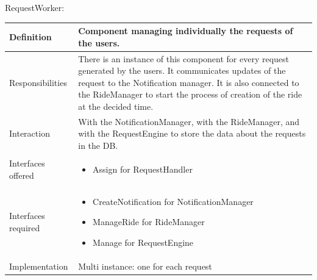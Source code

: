 \documentclass[a4paper,11pt]{report} %
\begin{document}
	\vspace*{0.35cm}
	\centerline{RequestWorker:}
	\begin{center}
		\begin{tabular}{| l | p{9cm} |}\hline
			Definition & Component managing individually the requests of the users.\\\hline
			Responsibilities & There is an instance of this component for every request generated by the users. It communicates updates of the request to the Notification manager. It is also connected to the RideManager to start the process of creation of the ride at the decided time.\\\hline
			Interaction & With the NotificationManager, with the RideManager, and with the RequestEngine to store the data about the requests in the DB.\\\hline
			Interfaces offered & \begin{itemize}
				\item Assign for RequestHandler
			\end{itemize}\\\hline
			Interfaces required & \begin{itemize}
				\item CreateNotification for NotificationManager
				\item ManageRide for RideManager
				\item Manage for RequestEngine
			\end{itemize}\\\hline
			Implementation & Multi instance: one for each request\\\hline
		\end{tabular}
	\end{center}	
	
\end{document}
